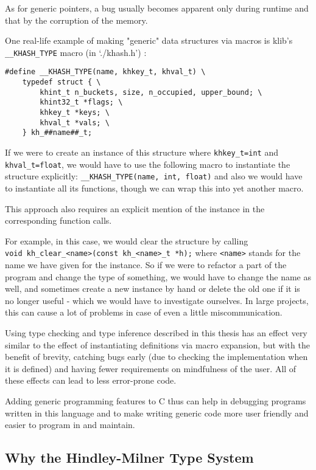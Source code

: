 As for generic pointers, a bug usually becomes apparent only during runtime and that by the corruption of the memory.

One real-life example of making "generic" data structures via macros is klib's \lstinline{__KHASH_TYPE} macro (in `./khash.h') \cite{attractivechaos2020klib}:

\begin{lstlisting}
#define __KHASH_TYPE(name, khkey_t, khval_t) \
    typedef struct { \
        khint_t n_buckets, size, n_occupied, upper_bound; \
        khint32_t *flags; \
        khkey_t *keys; \
        khval_t *vals; \
    } kh_##name##_t;
\end{lstlisting}

If we were to create an instance of this structure where \lstinline{khkey_t=int} and \lstinline{khval_t=float}, we would have to use the following macro to instantiate the structure explicitly: \lstinline{__KHASH_TYPE(name, int, float)} and also we would have to instantiate all its functions, though we can wrap this into yet another macro.

This approach also requires an explicit mention of the instance in the corresponding function calls.

For example, in this case, we would clear the structure by calling \\
\lstinline{void kh_clear_<name>(const kh_<name>_t *h);} where \lstinline{<name>} stands for the name we have given for the instance. So if we were to refactor a part of the program and change the type of something, we would have to change the name as well, and sometimes create a new instance by hand or delete the old one if it is no longer useful - which we would have to investigate ourselves. In large projects, this can cause a lot of problems in case of even a little miscommunication.

Using type checking and type inference described in this thesis has an effect very similar to the effect of instantiating definitions via macro expansion, but with the benefit of brevity, catching bugs early (due to checking the implementation when it is defined) and having fewer requirements on mindfulness of the user. All of these effects can lead to less error-prone code.

Adding generic programming features to C thus can help in debugging programs written in this language and to make writing generic code more user friendly and easier to program in and maintain.

\subsection{Why the Hindley-Milner Type System}

